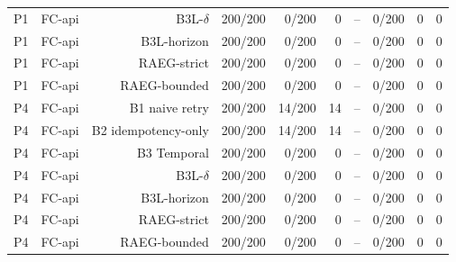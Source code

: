 \begin{table}[t]
\begin{tabular}{llrrrrrrrr}
P1 & FC-api & B3L-$\delta$ & 200/200 & 0/200 & 0 & -- & 0/200 & 0 & 0 \\
P1 & FC-api & B3L-horizon & 200/200 & 0/200 & 0 & -- & 0/200 & 0 & 0 \\
P1 & FC-api & RAEG-strict & 200/200 & 0/200 & 0 & -- & 0/200 & 0 & 0 \\
P1 & FC-api & RAEG-bounded & 200/200 & 0/200 & 0 & -- & 0/200 & 0 & 0 \\
P4 & FC-api & B1 naive retry & 200/200 & 14/200 & 14 & -- & 0/200 & 0 & 0 \\
P4 & FC-api & B2 idempotency-only & 200/200 & 14/200 & 14 & -- & 0/200 & 0 & 0 \\
P4 & FC-api & B3 Temporal & 200/200 & 0/200 & 0 & -- & 0/200 & 0 & 0 \\
P4 & FC-api & B3L-$\delta$ & 200/200 & 0/200 & 0 & -- & 0/200 & 0 & 0 \\
P4 & FC-api & B3L-horizon & 200/200 & 0/200 & 0 & -- & 0/200 & 0 & 0 \\
P4 & FC-api & RAEG-strict & 200/200 & 0/200 & 0 & -- & 0/200 & 0 & 0 \\
P4 & FC-api & RAEG-bounded & 200/200 & 0/200 & 0 & -- & 0/200 & 0 & 0 \\
\bottomrule
\end{tabular}
\end{table}

